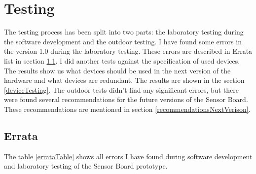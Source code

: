 \section{Testing}
\label{HWtesting}
The testing process has been split into two parts: the laboratory testing during the software development and the outdoor testing. I have found some errors in the version 1.0 during the laboratory testing. These errors are described in Errata list in section \ref{errata}. I did another tests against the specification of used devices. The results show us what devices should be used in the next version of the hardware and what devices are redundant. The results are shown in the section \ref{deviceTesting}. The outdoor tests didn't find any significant errors, but there were found several recommendations for the future versions of the Sensor Board. These recommendations are mentioned in section \ref{recommendationsNextVerison}.

\subsection{Errata}
\label{errata}
The table \ref{errataTable} shows all errors I have found during software development and laboratory testing of the Sensor Board prototype.

